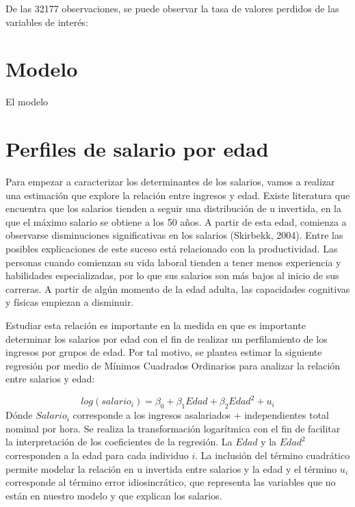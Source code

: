 \documentclass[
  11pt,
  letterpaper,
]{article}
\begin{document}
De las 32177 observaciones, se puede observar la tasa de valores
perdidos de las variables de interés:

\hypertarget{modelo}{%
\section{Modelo}\label{modelo}}

El modelo

\hypertarget{perfiles-de-salario-por-edad}{%
\section{Perfiles de salario por
edad}\label{perfiles-de-salario-por-edad}}

Para empezar a caracterizar los determinantes de los salarios, vamos a
realizar una estimación que explore la relación entre ingresos y edad.
Existe literatura que encuentra que los salarios tienden a seguir una
distribución de u invertida, en la que el máximo salario se obtiene a
los 50 años. A partir de esta edad, comienza a observarse disminuciones
significativas en los salarios (Skirbekk, 2004). Entre las posibles
explicaciones de este suceso está relacionado con la productividad. Las
personas cuando comienzan su vida laboral tienden a tener menos
experiencia y habilidades especializadas, por lo que sus salarios son
más bajos al inicio de sus carreras. A partir de algún momento de la
edad adulta, las capacidades cognitivas y físicas empiezan a disminuir.

Estudiar esta relación es importante en la medida en que es importante
determinar los salarios por edad con el fin de realizar un perfilamiento
de los ingresos por grupos de edad. Por tal motivo, se plantea estimar
la siguiente regresión por medio de Mínimos Cuadrados Ordinarios para
analizar la relación entre salarios y edad:

\[
log(salario_i)=\beta_0{}+\beta_1 Edad +\beta_2  Edad^2 +u_i
\] Dónde \(Salario_i\) corresponde a los ingresos asalariados +
independientes total nominal por hora. Se realiza la transformación
logarítmica con el fin de facilitar la interpretación de los
coeficientes de la regresión. La \(Edad\) y la \(Edad^2\) corresponden a
la edad para cada individuo \(i\). La inclusión del término cuadrático
permite modelar la relación en u invertida entre salarios y la edad y el
término \(u_i\) corresponde al término error idiosincrático, que
representa las variables que no están en nuestro modelo y que explican
los salarios.
\end{document}
